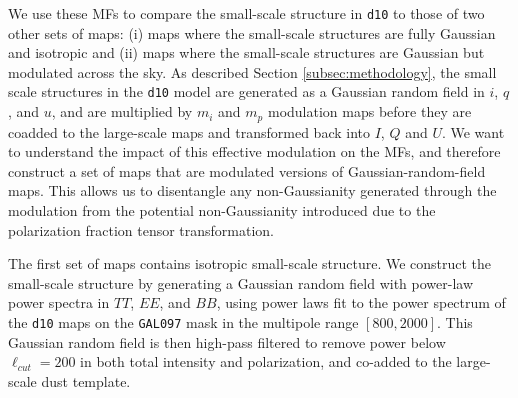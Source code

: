 \documentclass[twocolumn]{aastex631}
\begin{document}
We use these MFs to compare the small-scale structure in \texttt{d10} to those of two other sets of maps: (i) maps where the small-scale structures are fully Gaussian and isotropic and (ii) maps where the small-scale structures are Gaussian but modulated across the sky. As described Section \ref{subsec:methodology}, the small scale structures in the \texttt{d10} model are generated as a Gaussian random field in $i$, $q$, and $u$, and are multiplied by $m_i$ and $m_p$ modulation maps before they are coadded to the large-scale maps and transformed back into $I$, $Q$ and $U$. %
We want to understand the impact of this effective modulation on the MFs, and therefore construct a set of maps that are modulated versions of Gaussian-random-field maps. 
This allows us to disentangle any non-Gaussianity generated through the modulation from the potential non-Gaussianity introduced due to the polarization fraction tensor transformation.

The first set of maps contains isotropic small-scale structure. We construct the small-scale structure by generating a Gaussian random field with power-law power spectra in $TT$, $EE$, and $BB$, using power laws fit to the power spectrum of the \texttt{d10} maps on the \texttt{GAL097} mask in the multipole range $[800, 2000]$. This Gaussian random field is then high-pass filtered to remove power below $\ell_{cut} = 200$ in both total intensity and polarization, and co-added to the large-scale dust template.



\end{document}

